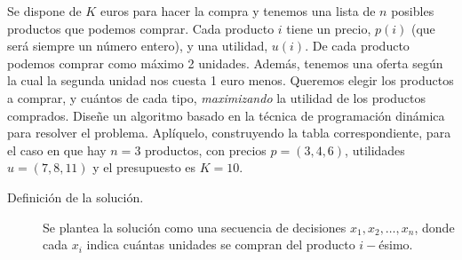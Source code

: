 \documentclass[12pt]{article}
\begin{document}
    \begin{ejercicio}[2 puntos]
        Se dispone de $K$ euros para hacer la compra y tenemos una lista de $n$ posibles productos que podemos comprar. Cada producto $i$ tiene un precio, $p(i)$ (que será siempre un número entero), y una utilidad, $u(i)$. De cada producto podemos comprar como máximo 2 unidades. Además, tenemos una oferta según la cual la segunda unidad nos cuesta 1 euro menos. Queremos elegir los productos a comprar, y cuántos de cada tipo, \textit{maximizando} la utilidad de los productos comprados. Diseñe un algoritmo basado en la técnica de programación dinámica para resolver el problema. Aplíquelo, construyendo la tabla correspondiente, para el caso en que hay $n= 3$ productos, con precios $p = (3,4,6)$, utilidades $u=(7,8,11)$ y el presupuesto es $K=10$.\\

        \noindent
        \begin{description}
            \item [Definición de la solución.] Se plantea la solución como una secuencia de decisiones $x_1,x_2,\ldots,x_n$, donde cada $x_i$ indica cuántas unidades se compran del producto $i-$ésimo.


\end{description}
\end{ejercicio}
\end{document}
